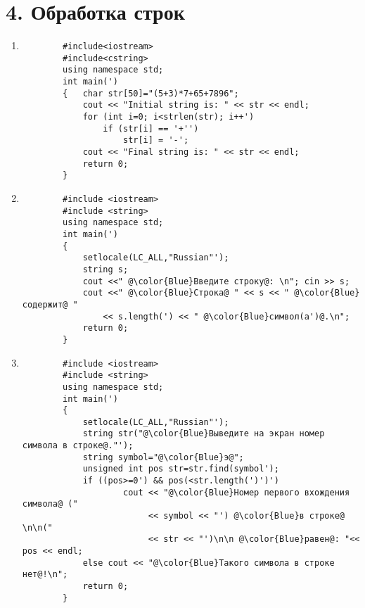 \section*{4. Обработка строк}
\begin{enumerate}[leftmargin=*]
    \item \begin{lstlisting}
        #include<iostream>
        #include<cstring>
        using namespace std;
        int main(')
        {   char str[50]="(5+3)*7+65+7896";
            cout << "Initial string is: " << str << endl;
            for (int i=0; i<strlen(str); i++')
                if (str[i] == '+'')
                    str[i] = '-';
            cout << "Final string is: " << str << endl;
            return 0;
        }
    \end{lstlisting}
    \setcounter{enumi}{2}
    \item \mbox{}  \begin{lstlisting}
        #include <iostream>
        #include <string>
        using namespace std;
        int main(')
        {
            setlocale(LC_ALL,"Russian"');
            string s;
            cout <<" @\color{Blue}Введите строку@: \n"; cin >> s;
            cout <<" @\color{Blue}Строка@ " << s << " @\color{Blue}содержит@ "
                << s.length(') << " @\color{Blue}символ(а')@.\n";
            return 0;
        }
    \end{lstlisting}
    \item \mbox{} \begin{lstlisting}
        #include <iostream>
        #include <string>
        using namespace std;
        int main(')
        {
            setlocale(LC_ALL,"Russian"');
            string str("@\color{Blue}Выведите на экран номер символа в строке@."');
            string symbol="@\color{Blue}э@";
            unsigned int pos str=str.find(symbol');
            if ((pos>=0') && pos(<str.length(')')')
                    cout << "@\color{Blue}Номер первого вхождения символа@ ("
                         << symbol << "') @\color{Blue}в строке@ \n\n("
                         << str << "')\n\n @\color{Blue}равен@: "<< pos << endl;
            else cout << "@\color{Blue}Такого символа в строке нет@!\n";
            return 0;
        }
    \end{lstlisting}
\end{enumerate}

